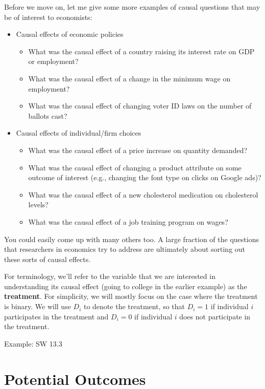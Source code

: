 \documentclass[
  letterpaper,
  DIV=11,
  numbers=noendperiod]{scrreprt}
\begin{document}
Before we move on, let me give some more examples of causal questions
that may be of interest to economists:

\begin{itemize}
\item
  Causal effects of economic policies

  \begin{itemize}
  \item
    What was the causal effect of a country raising its interest rate on
    GDP or employment?
  \item
    What was the causal effect of a change in the minimum wage on
    employment?
  \item
    What was the causal effect of changing voter ID laws on the number
    of ballots cast?
  \end{itemize}
\item
  Causal effects of individual/firm choices

  \begin{itemize}
  \item
    What was the causal effect of a price increase on quantity demanded?
  \item
    What was the causal effect of changing a product attribute on some
    outcome of interest (e.g., changing the font type on clicks on
    Google ads)?
  \item
    What was the causal effect of a new cholesterol medication on
    cholesterol levels?
  \item
    What was the causal effect of a job training program on wages?
  \end{itemize}
\end{itemize}

You could easily come up with many others too. A large fraction of the
questions that researchers in economics try to address are ultimately
about sorting out these sorts of causal effects.

For terminology, we'll refer to the variable that we are interested in
understanding its causal effect (going to college in the earlier
example) as the \textbf{treatment}. For simplicity, we will mostly focus
on the case where the treatment is binary. We will use \(D_i\) to denote
the treatment, so that \(D_i=1\) if individual \(i\) participates in the
treatment and \(D_i=0\) if individual \(i\) does not participate in the
treatment.

Example: SW 13.3

\section{Potential Outcomes}\label{potential-outcomes}
\end{document}
